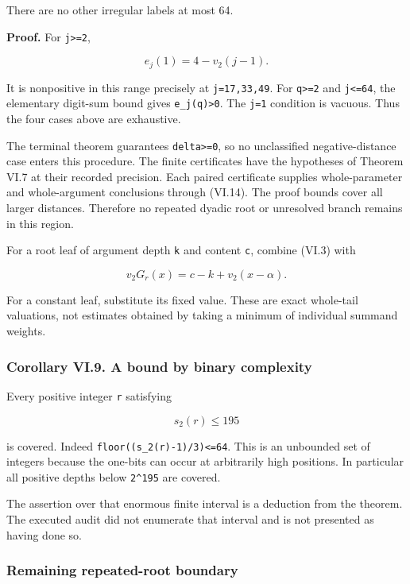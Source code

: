 \documentclass[11pt,letterpaper]{article}
\begin{document}
There are no other irregular labels at most 64.

\textbf{Proof.} For \texttt{j\textgreater{}=2},

\[
e_j(1)=4-v_2(j-1).
\]

It is nonpositive in this range precisely at \texttt{j=17,33,49}. For \texttt{q\textgreater{}=2} and \texttt{j\textless{}=64}, the elementary digit-sum bound gives \texttt{e\_j(q)\textgreater{}0}. The \texttt{j=1} condition is vacuous. Thus the four cases above are exhaustive.

The terminal theorem guarantees \texttt{delta\textgreater{}=0}, so no unclassified negative-distance case enters this procedure. The finite certificates have the hypotheses of Theorem VI.7 at their recorded precision. Each paired certificate supplies whole-parameter and whole-argument conclusions through (VI.14). The proof bounds cover all larger distances. Therefore no repeated dyadic root or unresolved branch remains in this region.

For a root leaf of argument depth \texttt{k} and content \texttt{c}, combine (VI.3) with

\[
v_2G_r(x)=c-k+v_2(x-\alpha).
\]

For a constant leaf, substitute its fixed value. These are exact whole-tail valuations, not estimates obtained by taking a minimum of individual summand weights.

\subsubsection{Corollary VI.9. A bound by binary complexity}\label{corollary-vi.9.-a-bound-by-binary-complexity}

Every positive integer \texttt{r} satisfying

\[
\boxed{s_2(r)\le195} \tag{VI.17}
\]

is covered. Indeed \texttt{floor((s\_2(r)-1)/3)\textless{}=64}. This is an unbounded set of integers because the one-bits can occur at arbitrarily high positions. In particular all positive depths below \texttt{2\^{}195} are covered.

The assertion over that enormous finite interval is a deduction from the theorem. The executed audit did not enumerate that interval and is not presented as having done so.

\subsubsection{Remaining repeated-root boundary}\label{remaining-repeated-root-boundary}
\end{document}
